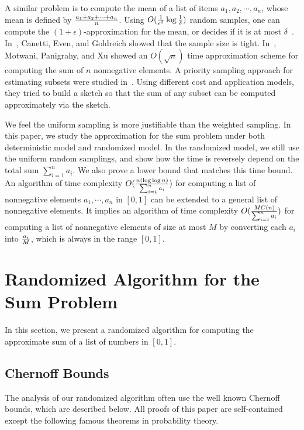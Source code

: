 \documentclass[runningheads]{llncs}
\newcommand{\timecomplexity}{O({n(\log\log n)\over \sum_{i=1}^n a_i})}
\begin{document}
A similar problem is to compute the mean of a list of items
$a_1,a_2,\cdots, a_n$, whose mean is defined by
${a_1+a_2+\cdots+a_n\over n}$. Using $O({1\over \epsilon^2}\log
{1\over \delta})$ random samples, one can compute the
$(1+\epsilon)$-approximation for the mean, or decides if it is at
most $\delta$~\cite{Hoefding63}. In~\cite{CanettiEvenGoldreich95},
Canetti, Even, and Goldreich showed that the sample size is tight.
In~\cite{MotwaniPanigrahyXu07}, Motwani, Panigrahy, and Xu showed an
$O(\sqrt{n})$ time approximation scheme for computing the sum of $n$
nonnegative elements.  A priority sampling approach for estimating
subsets were studied
in~\cite{AlonDuffieldLundThorup05,DuffieldLundThorup05,BroderFonturaJosifovskiKumarMotwaniNabarPanigrahyTomkinsXu06}.
Using  different cost and application models,  they tried to build a
sketch so that the sum of any subset can be computed approximately
via the sketch.

We feel the uniform sampling is more justifiable than the weighted
sampling. In this paper, we study the approximation for the sum
problem under both deterministic model and randomized model.  In the
randomized model, we still use the uniform random samplings, and
show how the time is reversely depend on the total sum $\sum_{i=1}^n
a_i$. We also prove a lower bound that matches this time bound. An
algorithm of time complexity $\timecomplexity$ for computing a list
of nonnegative elements $a_1,\cdots, a_n$ in $[0,1]$ can be extended
to a general list of nonnegative elements. It implies an algorithm
of time complexity $O({MC(n)\over \sum_{i=1}^n a_i})$ for computing
a list of nonnegative elements of size at most $M$ by converting
each $a_i$ into ${a_i\over M}$, which is always in the range
$[0,1]$.













\section{Randomized Algorithm for the Sum Problem}

In this section, we present a randomized algorithm for computing the
approximate sum of a list of numbers in $[0,1]$.

\subsection{Chernoff Bounds}\label{chernoff-sec}
 The analysis of our randomized
algorithm often use  the well known Chernoff bounds, which are
described below. All proofs of this paper are self-contained except
the following famous theorems in probability theory.
\end{document}
